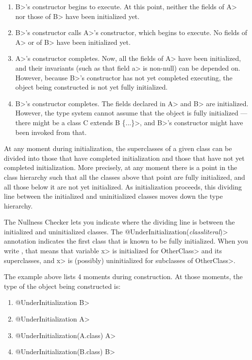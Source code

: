 \begin{enumerate}
\item \<B>'s constructor begins to execute.  At this point, neither the
  fields of \<A> nor those of \<B> have been initialized yet.
\item \<B>'s constructor calls \<A>'s constructor, which begins to execute.
  No fields of \<A> or of \<B> have been initialized yet.
\item \<A>'s constructor completes.  Now, all the fields of \<A> have been
  initialized, and their invariants (such as that field \<a> is non-null) can be
  depended on.  However, because \<B>'s constructor has not yet completed
  executing, the object being constructed is not yet fully initialized.
\item \<B>'s constructor completes.  The fields declared in \<A> and \<B>
  are initialized.  However, the type system cannot assume that the object
  is fully initialized --- there might be a \<class C extends B \{...\}>,
  and \<B>'s constructor might have been invoked from that.
\end{enumerate}

At any moment during initialization, the superclasses of a given class
can be divided into those that have completed initialization and those that
have not yet completed initialization.  More precisely, at any moment there
is a point in the class hierarchy such that all the classes above that
point are fully initialized, and all those below it are not yet
initialized.  As initialization proceeds, this dividing line between the
initialized and uninitialized classes moves down the type hierarchy.

The Nullness Checker lets you indicate where the dividing line is between
the initialized and uninitialized classes.
The \<@UnderInitialization(\emph{classliteral})> annotation
indicates the first class that is known to be fully initialized.
When you write , that
means that variable \<x> is initialized for \<OtherClass> and its
superclasses, and \<x> is (possibly) uninitialized for subclasses of \<OtherClass>.

The example above lists 4 moments during construction.  At those moments,
the type of the object being constructed is:

\begin{enumerate}
\item
  \<@UnderInitialization B>
\item
  \<@UnderInitialization A>
\item
  \<@UnderInitialization(A.class) A>
\item
  \<@UnderInitialization(B.class) B>
\end{enumerate}

